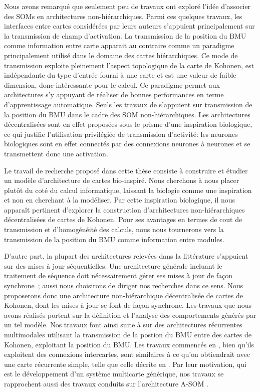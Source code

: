 \documentclass[../main]{subfiles}
\begin{document}
{Nous avons remarqué que seulement peu de travaux ont exploré l'idée d'associer des SOMs en architectures non-hiérarchiques.
Parmi ces quelques travaux, les interfaces entre cartes considérées par leurs auteurs s'appuient principalement sur la transmission de champ d'activation.
La transmission de la position du BMU comme information entre carte apparait au contraire comme un paradigme principalement utilisé dans le domaine des cartes hiérarchiques. Ce mode de transmission exploite pleinement l'aspect topologique de la carte de Kohonen, est indépendante du type d'entrée fourni à une carte et est une valeur de faible dimension, donc intéressante pour le calcul. Ce paradigme permet aux architectures s'y appuyant de réaliser de bonnes performances en terme d'apprentissage automatique.
Seuls les travaux de \cite{dominey13} s'appuient sur transmission de la position du BMU dans le cadre des SOM non-hiérarchiques.
Les architectures décentralisées sont en effet proposées sous le prisme d'une inspiration biologique, ce qui justifie l'utilisation privilégiée de transmission d'activité: les neurones biologiques sont en effet connectés par des connexions neurones à neurones et se transmettent donc une activation. 

Le travail de recherche proposé dans cette thèse consiste à construire et étudier un modèle d'architecture de cartes bio-inspiré.
Nous cherchons  à nous placer plutôt du coté du calcul informatique, laissant la biologie comme une inspiration et non en cherchant à la modéliser. 
Par cette inspiration biologique, il nous apparaît pertinent d'explorer la construction d'architectures non-hiérarchiques décentralisées de cartes de Kohonen. Pour ses avantages en termes de cout de transmission et d'homogénéité des calculs, nous nous tournerons vers la transmission de la position du BMU comme information entre modules.

D'autre part, la plupart des architectures relevées dans la littérature s'appuient sur des mises à jour séquentielles. 
Une architecture générale incluant le traitement de séquence doit nécessairement gérer ses mises à jour de façon synchrone~; aussi nous choisirons de diriger nos recherches dans ce sens.
Nous proposerons donc une architecture non-hiérarchique décentralisée de cartes de Kohonen, dont les mises à jour se font de façon synchrone. Les travaux que nous avons réalisés portent sur la définition et l'analyse des comportements générés par un tel modèle.
Nos travaux font ainsi suite à \cite{baheux_towards_2014} sur des architectures récurrentes multimodales utilisant la transmission de la postion du BMU entre des cartes de Kohonen, exploitant la position du BMU.
Les travaux commencés en \cite{baheux_towards_2014}, bien qu'ils exploitent des connexions intercartes, sont similaires à ce qu'on obtiendrait avec une carte récurrente simple, telle que celle décrite en \cite{fix20}.
Par leur motivation, qui est le développement d'un système multicarte générique, nos travaux se rapprochent aussi des travaux conduits sur l'architecture A-SOM \cite{johnsson_associating_2008, johnsson_associative_2009,gil_sarasom_2015, Buonamente2015DiscriminatingAS}.

}
\end{document}
